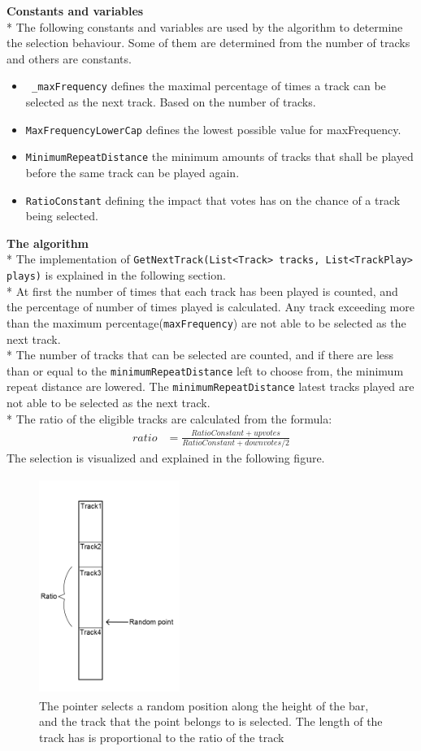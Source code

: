 \documentclass[a4paper,11pt,report]{article}
\begin{document}
\textbf{Constants and variables} \\*
The following constants and variables are used by the algorithm to determine the selection behaviour. Some of them are determined from the number of tracks and others are constants.
\begin{itemize}
\item \texttt{ \_maxFrequency} defines the maximal percentage of times a track can be selected as the next track. Based on the number of tracks.
\item \texttt{MaxFrequencyLowerCap} defines the lowest possible value for maxFrequency.
\item \texttt{MinimumRepeatDistance} the minimum amounts of tracks that shall be played before the same track can be played again.
\item \texttt{RatioConstant} defining the impact that votes has on the chance of a track being selected.
\end{itemize}
\textbf{The algorithm} \\*
The implementation of \texttt{GetNextTrack(List<Track> tracks, List<TrackPlay> plays)} is explained in the following section. \\*
At first the number of times that each track has been played is counted, and the percentage of number of times played is calculated. Any track exceeding more than the maximum percentage(\texttt{maxFrequency}) are not able to be selected as the next track. \\*
The number of tracks that can be selected are counted, and if there are less than or equal to the \texttt{minimumRepeatDistance} left to choose from, the minimum repeat distance are lowered. The \texttt{minimumRepeatDistance} latest tracks played are not able to be selected as the next track.  \\*
The ratio of the eligible tracks are calculated from the formula:
\begin{align*}
ratio &= \frac{RatioConstant + upvotes}{RatioConstant + downvotes/2}
\end{align*}
The selection is visualized and explained in the following figure.\\
\begin{figure}[htp]
\centering
\includegraphics[width=130pt,height=200pt,keepaspectratio=true]{./trackSelectionB.png}
\caption{The pointer selects a random position along the height of the bar, and the track that the point belongs to is selected. The length of the track has is proportional to the ratio of the track}
\end{figure}
\end{document}
